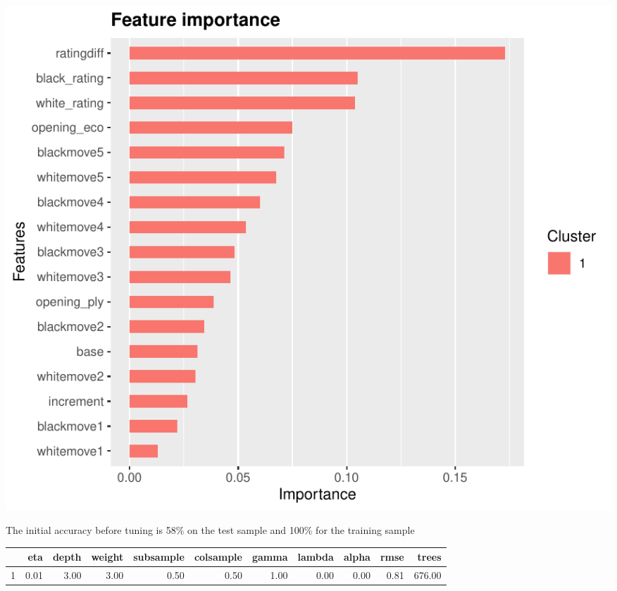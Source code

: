 \documentclass[12pt,preprint, authoryear]{elsarticle}
\let\origfigure\figure
\let\endorigfigure\endfigure
\renewenvironment{figure}[1][2] {
    \expandafter\origfigure\expandafter[H]
} {
    \endorigfigure
}
\let\origtable\table
\let\endorigtable\endtable
\renewenvironment{table}[1][2] {
    \expandafter\origtable\expandafter[H]
} {
    \endorigtable
}
\numberwithin{equation}{section}
\numberwithin{figure}{section}
\numberwithin{table}{section}
\begin{document}
\begin{figure}[H]

{\centering \includegraphics{WriteUp_files/figure-latex/impoerancehigh1-1} 

}

\caption{Feature Importance Untuned Model: Top Half\label{Figure13}}\label{fig:impoerancehigh1}
\end{figure}

The initial accuracy before tuning is 58\% on the test sample and 100\%
for the training sample

\begin{table}[H]
\centering
\begin{tabular}{rrrrrrrrrrr}
  \hline
 & eta & depth & weight & subsample & colsample & gamma & lambda & alpha & rmse & trees \\ 
  \hline
1 & 0.01 & 3.00 & 3.00 & 0.50 & 0.50 & 1.00 & 0.00 & 0.00 & 0.81 & 676.00 \\ 

   \hline
\end{tabular}
\caption{Hypergrid Top Half} 
\end{table}
\end{document}
